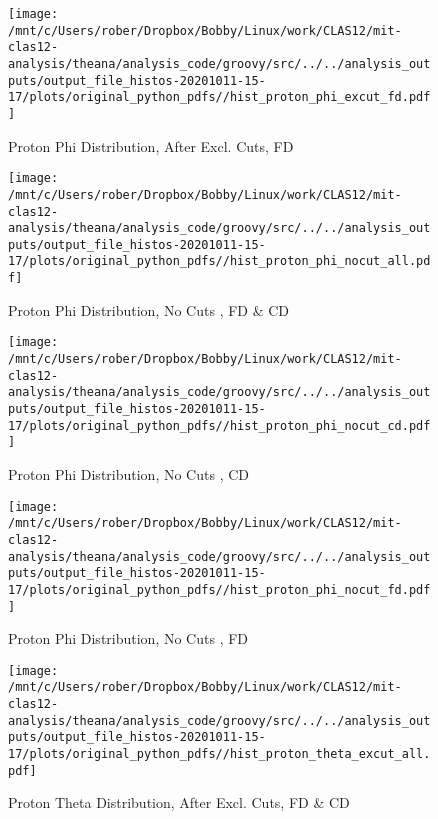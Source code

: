 \documentclass{article}
\begin{document}
\begin{landscape}
    \begin{figure}[h]
        \centering

        \texttt{[image: /mnt/c/Users/rober/Dropbox/Bobby/Linux/work/CLAS12/mit-clas12-analysis/theana/analysis\_code/groovy/src/../../analysis\_outputs/output\_file\_histos-20201011-15-17/plots/original\_python\_pdfs//hist\_proton\_phi\_excut\_fd.pdf]}
        \captionsetup{textformat=empty,labelformat=blank}
        \caption{Proton Phi Distribution, After Excl. Cuts, FD}
    \end{figure}
    \clearpage
    
    \begin{figure}[h]
        \centering

        \texttt{[image: /mnt/c/Users/rober/Dropbox/Bobby/Linux/work/CLAS12/mit-clas12-analysis/theana/analysis\_code/groovy/src/../../analysis\_outputs/output\_file\_histos-20201011-15-17/plots/original\_python\_pdfs//hist\_proton\_phi\_nocut\_all.pdf]}
        \captionsetup{textformat=empty,labelformat=blank}
        \caption{Proton Phi Distribution, No Cuts , FD \& CD}
    \end{figure}
    \clearpage
    
    \begin{figure}[h]
        \centering

        \texttt{[image: /mnt/c/Users/rober/Dropbox/Bobby/Linux/work/CLAS12/mit-clas12-analysis/theana/analysis\_code/groovy/src/../../analysis\_outputs/output\_file\_histos-20201011-15-17/plots/original\_python\_pdfs//hist\_proton\_phi\_nocut\_cd.pdf]}
        \captionsetup{textformat=empty,labelformat=blank}
        \caption{Proton Phi Distribution, No Cuts , CD}
    \end{figure}
    \clearpage
    
    \begin{figure}[h]
        \centering

        \texttt{[image: /mnt/c/Users/rober/Dropbox/Bobby/Linux/work/CLAS12/mit-clas12-analysis/theana/analysis\_code/groovy/src/../../analysis\_outputs/output\_file\_histos-20201011-15-17/plots/original\_python\_pdfs//hist\_proton\_phi\_nocut\_fd.pdf]}
        \captionsetup{textformat=empty,labelformat=blank}
        \caption{Proton Phi Distribution, No Cuts , FD}
    \end{figure}
    \clearpage
    
    \begin{figure}[h]
        \centering

        \texttt{[image: /mnt/c/Users/rober/Dropbox/Bobby/Linux/work/CLAS12/mit-clas12-analysis/theana/analysis\_code/groovy/src/../../analysis\_outputs/output\_file\_histos-20201011-15-17/plots/original\_python\_pdfs//hist\_proton\_theta\_excut\_all.pdf]}
        \captionsetup{textformat=empty,labelformat=blank}
        \caption{Proton Theta Distribution, After Excl. Cuts, FD \& CD}
    \end{figure}
    \clearpage
    

\end{landscape}
\end{document}
